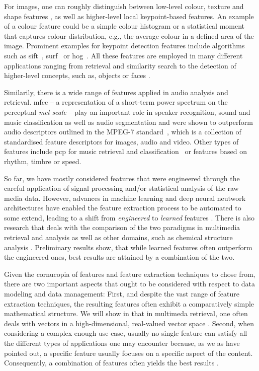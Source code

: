 For images, one can roughly distinguish between low-level colour, texture and shape features \cite{Salau:2019Feature}, as well as higher-level local keypoint-based features. An example of a colour feature could be a simple colour histogram or a statistical moment that captures colour distribution, e.g., the average colour in a defined area of the image. Prominent examples for keypoint detection features include algorithms such as \acrfull{sift}~\cite{Lowe:1999object}, \acrfull{surf}~\cite{Bay:2006surf} or \acrfull{hog}~\cite{Dalal:2005Histograms}. All these features are employed in many different applications ranging from retrieval and similarity search to the detection of higher-level concepts, such as, objects or faces \cite{Deniz:2011Face, Farooq:2016Object}.

Similarily, there is a wide range of features applied in audio analysis and retrieval. \acrfull{mfcc} -- a representation of a short-term power spectrum on the perceptual \emph{mel scale} -- play an important role in speaker recognition, sound and music classification as well as audio segmentation \cite{Kim:2010Comparison} and were shown to outperform audio descriptors outlined in the MPEG-7 standard~\cite{Quackenbush:2001Overview}, which is a collection of standardised feature descriptors for images, audio and video. Other types of features include \acrfull{pcp} for music retrieval and classification~\cite{Lee:2006Automatic,Demirel:2019Automatic} or features based on rhythm, timbre or speed.

So far, we have mostly considered features that were engineered through the careful application of signal processing and/or statistical analysis of the raw media data. However, advances in machine learning and deep neural neutwork architectures have enabled the feature extraction process to be automated to some extend, leading to a shift from  \emph{engineered} to \emph{learned} features \cite{Hamel:2010Learning,Gordo:2016Deep}. There is also research that deals with the comparison of the two paradigms in multimedia retrieval and analysis \cite{Budnik:2017learned} as well as other domains, such as chemical structure analysis \cite{Gallegos:2021importance}. Preliminary results show, that while learned features often outperform the engineered ones, best results are attained by a combination of the two.

Given the cornucopia of features and feature extraction techniques to chose from, there are two important aspects that ought to be considered with respect to data modeling and data management: First, and despite the vast range of feature extraction techniques, the resulting features often exhibit a comparatively simple mathematical structure. We will show in  that in multimeda retrieval, one often deals with vectors in a high-dimensional, real-valued vector space \cite{Zezula:2006Similarity}. Second, when considering a complex enough use-case, usually no single feature can satisfy all the different types of applications one may encounter because, as we as have pointed out, a specific feature usually focuses on a specific aspect of the content. Consequently, a combination of features often yields the best results \cite{Deselaers:2008Features}.

